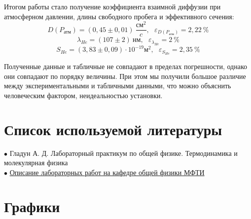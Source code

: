 Итогом работы стало получение коэффициента взаимной диффузии при атмосферном давлении, длины свободного пробега и эффективного сечения:
\[D(P_{\text{атм}}) = (0,45 \pm 0,01)\ \frac{\text{см}^2}{c}, \ ~ \ \varepsilon_{D(P_{\text{атм}})} = 2,22\ \% \]
\[\lambda_{He} = (107 \pm 2)\ \text{нм}, \ ~ \ \varepsilon_{\lambda_{He}} = 2\ \%\]
\[S_{He} = (3,83 \pm 0,09) \cdot 10^{-19} \text{м}^2,\ ~ \  \varepsilon_{S_{He}} = 2,35\ \% \]
 
 
Полученные данные и табличные не совпадают в пределах погрешности, однако они совпадают по порядку величины. При этом мы получили большое различие между экспериментальными и табличными данными, что можно объяснить человеческим фактором, неидеальностью установки.


\section{Список используемой литературы}

$\bullet$ Гладун А. Д. Лабораторный практикум по общей физике. Термодинамика и молекулярная физика\\

$\bullet$ \href{https://mipt.ru/education/chair/physics/S_II/lab/}{Описание лабораторных работ на кафедре общей физики МФТИ}

\newpage

\section{Графики}

